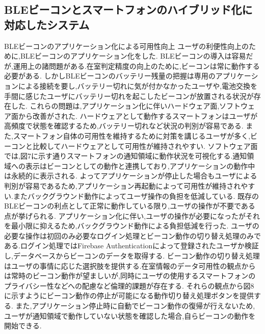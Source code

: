 
\subsection{BLEビーコンとスマートフォンのハイブリッド化に対応したシステム}
BLEビーコンのアプリケーション化による可用性向上
ユーザの利便性向上のために,BLEビーコンのアプリケーション化をした.
BLEビーコンの導入は容易だが,運用上の諸問題がある.在室判定精度の向上のために,ビーコンは常に動作する必要がある.
しかしBLEビーコンのバッテリー残量の把握は専用のアプリケーションによる接続を要し,バッテリー切れに気が付かなかったユーザや,電池交換を手間に感じたユーザにバッテリー切れを起こしたビーコンが放置される状況が存在した.
これらの問題は,アプリケーション化に伴いハードウェア面,ソフトウェア面から改善がされた.
ハードウェアとして動作するスマートフォンはユーザが高頻度で状態を確認するため,バッテリー切れなど状況の判別が容易である.
また,スマートフォン自体の可用性を維持するために対策を講じるユーザが多く,ビーコンと比較してハードウェアとして可用性が維持されやすい.
ソフトウェア面では,図7に示す通りスマートフォンの通知領域に動作状況を可視化する.通知領域への表示はビーコンとしての動作と連携しており,アプリケーションの動作中は永続的に表示される.
よってアプリケーションが停止した場合もユーザによる判別が容易であるため,アプリケーション再起動によって可用性が維持されやすい.またバックグラウンド動作によってユーザ操作の負担を低減している.
既存のBLEビーコンの利点として正常に動作している限り,ユーザの操作が不要である点が挙げられる.
アプリケーション化に伴い,ユーザの操作が必要になったがそれを最小限に抑えるため,バックグラウンド動作による負担低減を行った.
ユーザの必要な操作は初回のみ必要なログイン処理とビーコン動作の切り替え処理のみである.ログイン処理ではFirebase Authenticationによって登録されたユーザか検証し,データベースからビーコンのデータを取得する.
ビーコン動作の切り替え処理はユーザの事情に応じた選択肢を提供する.在室情報のデータ可用性の観点からは常時のビーコン動作が望ましいが,同時にユーザの使用するスマートフォンのプライバシー性などへの配慮など倫理的課題が存在する.
それらの観点から図8に示すようにビーコン動作の停止が可能になる動作切り替え処理ボタンを提供する.
また,アプリケーション停止時に自動でビーコン動作の復帰が行えないため,ユーザが通知領域で動作していない状態を確認した場合,自らビーコンの動作を開始できる.